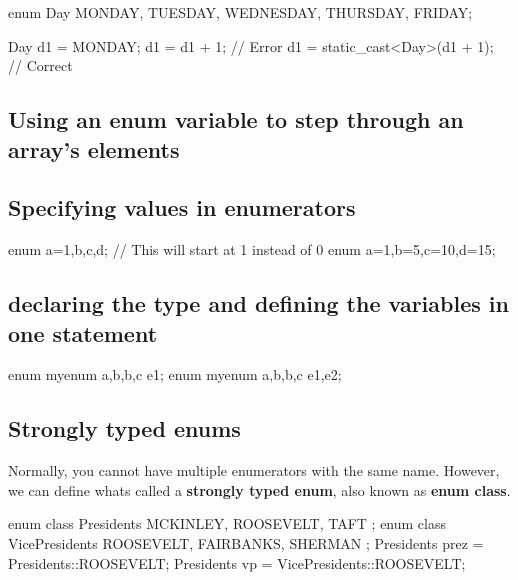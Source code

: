 \documentclass{report}
\begin{document}
    \begin{cppcode}
enum Day { MONDAY, TUESDAY, WEDNESDAY, THURSDAY, FRIDAY};

Day d1 = MONDAY;
d1 = d1 + 1; // Error
d1 = static_cast<Day>(d1 + 1); // Correct
    \end{cppcode}
    

    \bigbreak \noindent 
    \subsection{Using an enum variable to step through an array's elements}
    \bigbreak \noindent 

    \pagebreak
    \subsection{Specifying values in enumerators}
    \bigbreak \noindent 
    
    \begin{cppcode}
enum {a=1,b,c,d}; // This will start at 1 instead of 0
enum {a=1,b=5,c=10,d=15}; 
    \end{cppcode}
    
    \bigbreak \noindent 
    \subsection{declaring the type and defining the variables in one statement}
    \bigbreak \noindent 
    
    \begin{cppcode}
enum myenum {a,b,b,c} e1;
enum myenum {a,b,b,c} e1,e2;
    \end{cppcode}
    

    \bigbreak \noindent 
    \subsection{Strongly typed enums}
    \bigbreak \noindent 
    Normally, you cannot have multiple enumerators with the same name. However, we can define whats called a \textbf{strongly typed enum}, also known as \textbf{enum class}.
    \bigbreak \noindent 
    
    \begin{cppcode}
enum class Presidents { MCKINLEY, ROOSEVELT, TAFT }; 
enum class VicePresidents { ROOSEVELT, FAIRBANKS, SHERMAN };
Presidents prez = Presidents::ROOSEVELT;
Presidents vp = VicePresidents::ROOSEVELT;
    \end{cppcode}
    
\end{document}
